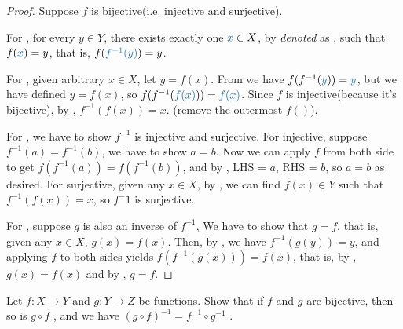 \begin{proof}
Suppose \(f\) is bijective(i.e. injective and surjective).

For , for every \(y \in Y\), there exists exactly one \(\BLUE{x} \in X\), by  \emph{denoted} as , such that \(f(\BLUE{x}) = y\), that is, \(f(\BLUE{f^{-1}(y)}) = y\).

For , given arbitrary \(x \in X\), let \(y = f(x)\).
From  we have \(f(f^{-1}(\BLUE{y})) = \BLUE{y}\), but we have defined \(y = f(x)\), so \(f(f^{-1}(\BLUE{f(x)})) = \BLUE{f(x)}\).
Since \(f\) is injective(because it's bijective), by , \(f^{-1}(f(x)) = x\). (remove the outermost \(f()\)).

For , we have to show \(f^{-1}\) is injective and surjective.
For injective, suppose \(f^{-1}(a) = f^{-1}(b)\), we have to show \(a = b\). Now we can apply \(f\) from both side to get \(f(f^{-1}(a)) = f(f^{-1}(b))\), and by , LHS = \(a\), RHS = \(b\), so \(a = b\) as desired.
For surjective, given any \(x \in X\), by , we can find \(f(x) \in Y\) such that \(f^{-1}(f(x)) = x\), so \(f^-1\) is surjective.

For , suppose \(g\) is also an inverse of \(f^{-1}\), We have to show that \(g = f\), that is, given any \(x \in X\), \(g(x) = f(x)\).
Then, by , we have \(f^{-1}(g(y)) = y\), and applying \(f\) to both sides yields \(f(f^{-1}(g(x))) = f(x)\), that is, by , \(g(x) = f(x)\) and by , \(g = f\).
\end{proof}

\begin{exercise} \label{exercise 3.3.7}
Let \(f : X \rightarrow Y\) and \(g : Y \rightarrow Z\) be functions.
Show that if \(f\) and \(g\) are bijective, then so is \(g \circ f\) , and we have \((g \circ f)^{-1} = f^{-1} \circ g^{-1}\) .
\end{exercise}

